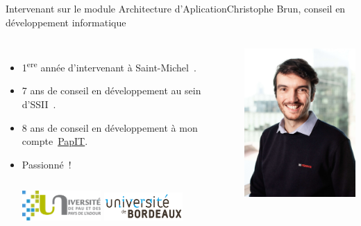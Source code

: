 \documentclass{beamer}
\begin{document}
    \begin{frame}{Intervenant sur le module Architecture d'Aplication}{Christophe Brun, conseil en développement informatique}

        \begin{columns}
            \begin{itemize}
                \item 1\textsuperscript{ere} année d'intervenant à Saint-Michel~.

                \item 7 ans de conseil en développement au sein d'SSII~.

                \item 8 ans de conseil en développement à mon compte~\href{https://papit.fr}{PapIT}.

                \item Passionné~!
                \bigbreak
                \begin{columns}
                    \centering
                    \includegraphics[width=3cm]{image/logo-uppa}
                    \centering
                    \includegraphics[width=3cm]{image/logo-universite-bordeaux}
                \end{columns}
            \end{itemize}
            \centering
            \includegraphics[width=5cm]{image/trombine-christophe}
        \end{columns}
    \end{frame}
\end{document}
